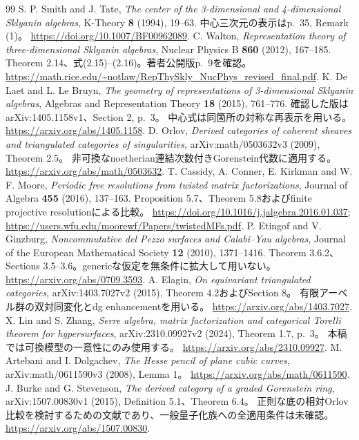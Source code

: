 \begin{thebibliography}{99}
S. P. Smith and J. Tate,
\emph{The center of the 3-dimensional and 4-dimensional Sklyanin algebras},
K-Theory \textbf{8} (1994), 19--63.
中心三次元の表示はp.~35, Remark (1)。
\url{https://doi.org/10.1007/BF00962089}.
C. Walton, \emph{Representation theory of three-dimensional Sklyanin algebras},
Nuclear Physics B \textbf{860} (2012), 167--185.
Theorem 2.14、式(2.15)--(2.16)。著者公開版p.~9を確認。
\url{https://math.rice.edu/~notlaw/RepThySkly_NucPhys_revised_final.pdf}.
K. De Laet and L. Le Bruyn,
\emph{The geometry of representations of 3-dimensional Sklyanin algebras},
Algebras and Representation Theory \textbf{18} (2015), 761--776.
確認した版はarXiv:1405.1158v1、Section 2, p.~3。
中心式は同箇所の対称な再表示を用いる。
\url{https://arxiv.org/abs/1405.1158}.
D. Orlov, \emph{Derived categories of coherent sheaves and triangulated categories of singularities},
arXiv:math/0503632v3 (2009), Theorem 2.5。
非可換なnoetherian連結次数付きGorenstein代数に適用する。
\url{https://arxiv.org/abs/math/0503632}.
T. Cassidy, A. Conner, E. Kirkman and W. F. Moore,
\emph{Periodic free resolutions from twisted matrix factorizations},
Journal of Algebra \textbf{455} (2016), 137--163.
Proposition 5.7、Theorem 5.8およびfinite projective resolutionによる比較。
\url{https://doi.org/10.1016/j.jalgebra.2016.01.037};
\url{https://users.wfu.edu/moorewf/Papers/twistedMFs.pdf}.
P. Etingof and V. Ginzburg,
\emph{Noncommutative del Pezzo surfaces and Calabi--Yau algebras},
Journal of the European Mathematical Society \textbf{12} (2010), 1371--1416.
Theorem 3.6.2、Sections 3.5--3.6。genericな仮定を無条件に拡大して用いない。
\url{https://arxiv.org/abs/0709.3593}.
A. Elagin, \emph{On equivariant triangulated categories},
arXiv:1403.7027v2 (2015), Theorem 4.2およびSection 8。
有限アーベル群の双対同変化とdg enhancementを用いる。
\url{https://arxiv.org/abs/1403.7027}.
X. Lin and S. Zhang,
\emph{Serre algebra, matrix factorization and categorical Torelli theorem for hypersurfaces},
arXiv:2310.09927v2 (2024), Theorem 1.7, p.~3。
本稿では可換模型の一意性にのみ使用する。
\url{https://arxiv.org/abs/2310.09927}.
M. Artebani and I. Dolgachev, \emph{The Hesse pencil of plane cubic curves},
arXiv:math/0611590v3 (2008), Lemma 1。
\url{https://arxiv.org/abs/math/0611590}.
J. Burke and G. Stevenson, \emph{The derived category of a graded Gorenstein ring},
arXiv:1507.00830v1 (2015), Definition 5.1、Theorem 6.4。
正則な底の相対Orlov比較を検討するための文献であり、一般量子化族への全適用条件は未確認。
\url{https://arxiv.org/abs/1507.00830}.
\end{thebibliography}